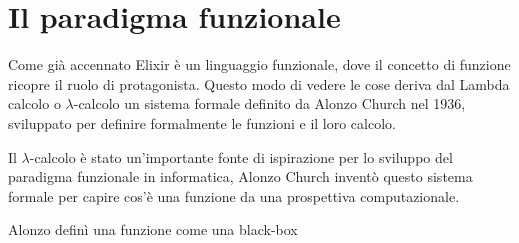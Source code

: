 \section{Il paradigma funzionale}
Come già accennato Elixir è un linguaggio funzionale, dove
il concetto di funzione ricopre il ruolo di protagonista.
Questo modo di vedere le cose deriva dal Lambda calcolo o $\lambda$-calcolo
\cite{Lambdaca75:online}
un sistema formale definito da Alonzo Church nel 1936, sviluppato
per definire formalmente le funzioni e il loro calcolo.

Il $\lambda$-calcolo è stato un'importante fonte di ispirazione per lo sviluppo 
del paradigma funzionale in informatica, Alonzo Church inventò questo sistema formale
per capire cos'è una funzione da una prospettiva computazionale.

Alonzo definì una funzione come una black-box



